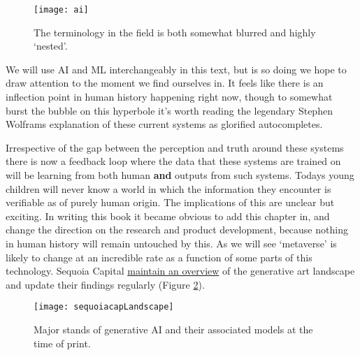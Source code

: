 \begin{figure}[ht]\centering 	\texttt{[image: ai]}
	\caption{The terminology in the field is both somewhat blurred and highly `nested'.}
	\label{fig:aiVenn}
\end{figure}

We will use AI and ML interchangeably in this text, but is so doing we hope to draw attention to the moment we find ourselves in. It feels like there is an inflection point in human history happening right now, though to somewhat burst the bubble on this hyperbole it's worth reading the legendary Stephen Wolframs explanation of these current systems as glorified autocompletes. \par
Irrespective of the gap between the perception and truth around these systems there is now a feedback loop where the data that these systems are trained on will be learning from both human \textbf{and} outputs from such systems. Todays young children will never know a world in which the information they encounter is verifiable as of purely human origin. The implications of this are unclear but exciting. In writing this book it became obvious to add this chapter in, and change the direction on the research and product development, because nothing in human history will remain untouched by this. As we will see `metaverse' is likely to change at an incredible rate as a function of some parts of this technology. Sequoia Capital \href{https://www.sequoiacap.com/article/generative-ai-a-creative-new-world/}{maintain an overview} of the generative art landscape and update their findings regularly (Figure \ref{fig:sequoiacapLandscape}).
\begin{figure}[ht]\centering 	\texttt{[image: sequoiacapLandscape]}
	\caption{Major stands of generative AI and their associated models at the time of print.}
	\label{fig:sequoiacapLandscape}
\end{figure}
